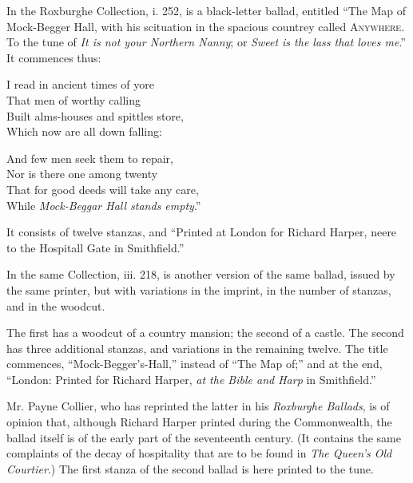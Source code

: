 In the Roxburghe Collection, i. 252, is a black-letter ballad, entitled “The
Map of Mock-Begger Hall, with his scituation in the spacious countrey called
\textsc{Anywhere}. To the tune of \textit{It is not your Northern Nanny}; or \textit{Sweet is the
lass that loves me}.” It commences thus:
\begin{dcverse}\begin{altverse}
I read in ancient times of yore\\
That men of worthy calling\\
Built alms-houses and spittles store,\\
Which now are all down falling:
\end{altverse}

\begin{altverse}
And few men seek them to repair,\\
Nor is there one among twenty\\
That for good deeds will take any care,\\
While \textit{Mock-Beggar Hall stands empty}.”
\end{altverse}
\end{dcverse}

It consists of twelve stanzas, and “Printed at London for Richard Harper, neere
to the Hospitall Gate in Smithfield.”

In the same Collection, iii. 218, is another version of the same ballad, issued
by the same printer, but with variations in the imprint, in the number of stanzas,
and in the woodcut.

The first has a woodcut of a country mansion; the second of a castle. The
second has three additional stanzas, and variations in the remaining twelve.
The title commences, “Mock-Begger’s-Hall,” \pagebreak instead of “The Map of;” and
at the end, “London: Printed for Richard Harper, \textit{at the Bible and Harp} in
Smithfield.”

Mr. Payne Collier, who has reprinted the latter in his \textit{Roxburghe Ballads}, is of
opinion that, although Richard Harper printed during the Commonwealth, the
ballad itself is of the early part of the seventeenth century. (It contains the
same complaints of the decay of hospitality that are to be found in \textit{The Queen's
Old Courtier}.) The first stanza of the second ballad is here printed to the tune.

